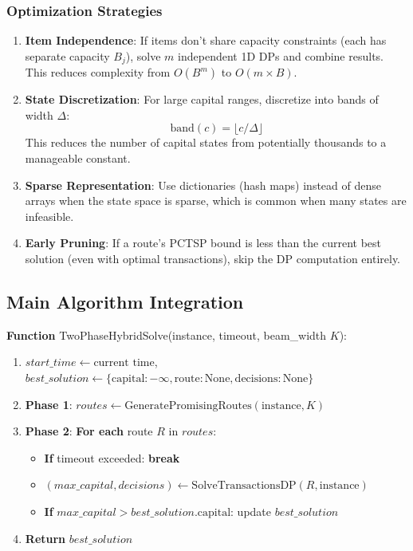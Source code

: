 \documentclass[12pt]{article}
\begin{document}
\subsubsection{Optimization Strategies}

\begin{enumerate}
    \item \textbf{Item Independence}: If items don't share capacity constraints (each has separate capacity $B_j$), solve $m$ independent 1D DPs and combine results. This reduces complexity from $O(B^m)$ to $O(m \times B)$.
    
    \item \textbf{State Discretization}: For large capital ranges, discretize into bands of width $\Delta$:
    $$\text{band}(c) = \lfloor c / \Delta \rfloor$$
    This reduces the number of capital states from potentially thousands to a manageable constant.
    
    \item \textbf{Sparse Representation}: Use dictionaries (hash maps) instead of dense arrays when the state space is sparse, which is common when many states are infeasible.
    
    \item \textbf{Early Pruning}: If a route's PCTSP bound is less than the current best solution (even with optimal transactions), skip the DP computation entirely.
\end{enumerate}

\subsection{Main Algorithm Integration}

\textbf{Function} TwoPhaseHybridSolve(instance, timeout, beam\_width $K$):
\begin{enumerate}
    \item $start\_time \gets \text{current time}$, $best\_solution \gets \{\text{capital}: -\infty, \text{route}: \text{None}, \text{decisions}: \text{None}\}$
    \item \textbf{Phase 1}: $routes \gets \text{GeneratePromisingRoutes}(\text{instance}, K)$
    \item \textbf{Phase 2}: \textbf{For each} route $R$ in $routes$:
    \begin{itemize}
        \item \textbf{If} timeout exceeded: \textbf{break}
        \item $(max\_capital, decisions) \gets \text{SolveTransactionsDP}(R, \text{instance})$
        \item \textbf{If} $max\_capital > best\_solution.\text{capital}$: update $best\_solution$
    \end{itemize}
    \item \textbf{Return} $best\_solution$
\end{enumerate}
\end{document}
